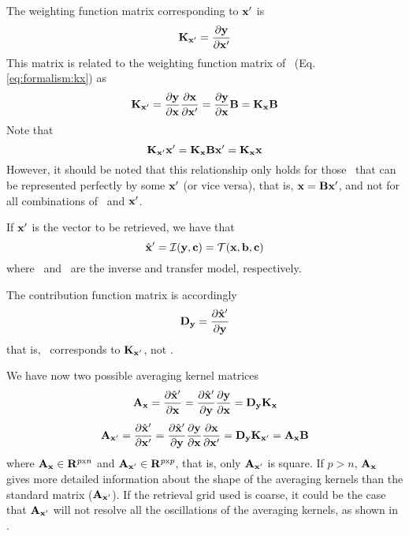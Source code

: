   The weighting function matrix corresponding to $\mathbf{x}'$ is
  \begin{equation}
    \mathbf{K}_{\mathbf{x}'} = \frac{\partial \mathbf{y}}{\partial \mathbf{x}'}
  \end{equation}
  This matrix is related to the weighting function matrix of \xt\ (Eq.
  \ref{eq:formalism:kx}) as
  \begin{equation}
    \mathbf{K}_{\mathbf{x}'}
      = \frac{\partial \mathbf{y}}{\partial \mathbf{x}} \frac{\partial \mathbf{x}}{\partial \mathbf{x}'}
      = \frac{\partial \mathbf{y}}{\partial \mathbf{x}} \mathbf{B} 
      = \mathbf{K_x} \mathbf{B}
  \end{equation}
  Note that
  \begin{equation}
    \mathbf{K}_{\mathbf{x}'}\mathbf{x}' = \mathbf{K_x}\mathbf{B}\mathbf{x}' =  \mathbf{K_x}\mathbf{x}
  \end{equation}
  However, it should be noted that this relationship only holds for
  those \xt\ that can be represented perfectly by some $\mathbf{x}'$ (or vice
  versa), that is, $\mathbf{x}=\mathbf{B}\mathbf{x}'$, and not for all combinations of \xt\ 
  and $\mathbf{x}'$.

  If $\mathbf{x}'$ is the vector to be retrieved, we have that \citep{rodgers:90}
  \begin{equation}
    \hat{\mathbf{x}}' = \mathcal{I}(\mathbf{y},\mathbf{c}) = \mathcal{T}(\mathbf{x},\mathbf{b},\mathbf{c})
  \end{equation}
  where \im\ and \tm\ are the inverse and transfer model, respectively.

  The contribution function matrix is accordingly
  \begin{equation}
    \mathbf{D_y} =  \frac{\partial \hat{\mathbf{x}}'}{\partial \mathbf{y}}
  \end{equation}
  that is, \Dy\ corresponds to $\mathbf{K}_{\mathbf{x}'}$, not \Kx.
  
  We have now two possible averaging kernel matrices
  \begin{equation}
    \mathbf{A}_{\mathbf{x}} 
      = \frac{\partial \hat{\mathbf{x}}'}{\partial \mathbf{x}} 
      = \frac{\partial \hat{\mathbf{x}}'}{\partial \mathbf{y}} \frac{\partial \mathbf{y}}{\partial \mathbf{x}}
      = \mathbf{D_y} \mathbf{K_x}
  \end{equation}
  \begin{equation}
    \mathbf{A}_{\mathbf{x}'} 
      = \frac{\partial \hat{\mathbf{x}}'}{\partial \mathbf{x}'} 
      = \frac{\partial\hat{\mathbf{x}}'}{\partial\mathbf{y}}\frac{\partial\mathbf{y}}{\partial\mathbf{x}}
      \frac{\partial\mathbf{x}}{\partial\mathbf{x}'}
      = \mathbf{D_y} \mathbf{K}_{\mathbf{x}'}
      = \mathbf{A}_{\mathbf{x}} \mathbf{B}
  \end{equation}
  where $\mathbf{A}_{\mathbf{x}} \in {\bf R}^{p {\mathrm x} n}$ and $\mathbf{A}_{\mathbf{x}'} \in {\bf R}^{p {\mathrm x} p}$,
  that is, only $\mathbf{A}_{\mathbf{x}'}$ is square. If $p>n$, $\mathbf{A}_{\mathbf{x}}$ gives more
  detailed information about the shape of the averaging kernels than
  the standard matrix ($\mathbf{A}_{\mathbf{x}'}$). If the retrieval grid used is
  coarse, it could be the case that $\mathbf{A}_{\mathbf{x}'}$ will not resolve all
  the oscillations of the averaging kernels, as shown in
  \citet[][Figure 11]{eriksson:99}.

  
  

    




